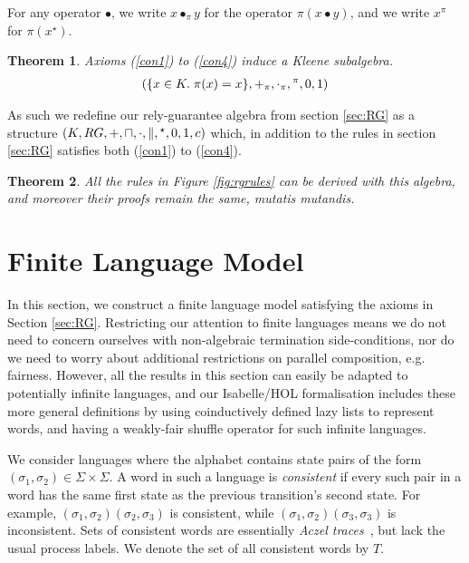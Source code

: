 \documentclass{llncs}
\newtheorem{thm}{Theorem}
\begin{document}
For any operator $\bullet$, we write $x \bullet_\pi y$ for the
operator $\pi(x\bullet y)$, and we write $x^\pi$ for
$\pi(x^\star)$.
\begin{thm}
Axioms (\ref{con1}) to (\ref{con4}) induce a Kleene subalgebra.
\begin{align*}
(\{x\in K.\; \pi(x) = x\}, +_\pi, \cdot_\pi, \hphantom{}^\pi,0,1)
\end{align*}
\end{thm}
As such we redefine our rely-guarantee algebra from section
\ref{sec:RG} as a structure $(K,RG,+,\sqcap,\cdot,\|,\hphantom{}^\star,0,1,c)$
which, in addition to the rules in section \ref{sec:RG} satisfies both
(\ref{con1}) to (\ref{con4}).
\begin{thm}
All the rules in Figure \ref{fig:rgrules} can be derived with this
algebra, and moreover their proofs remain the same, mutatis
mutandis.
\end{thm}

\section{Finite Language Model}
\label{sec:Model}

In this section, we construct a finite language model satisfying the
axioms in Section \ref{sec:RG}. Restricting our attention to finite
languages means we do not need to concern ourselves with non-algebraic
termination side-conditions, nor do we need to worry about additional
restrictions on parallel composition, e.g. fairness. However, all the
results in this section can easily be adapted to potentially
infinite languages, and our Isabelle/HOL formalisation includes these more
general definitions by using coinductively defined lazy lists to
represent words, and having a weakly-fair shuffle operator for such
infinite languages.

We consider languages where the alphabet contains state pairs of the
form $(\sigma_1,\sigma_2) \in \Sigma \times \Sigma$. A word in such a
language is \emph{consistent} if every such pair in a word has the
same first state as the previous transition's second state. For
example, $(\sigma_1,\sigma_2)(\sigma_2,\sigma_3)$ is consistent, while
$(\sigma_1,\sigma_2)(\sigma_3,\sigma_3)$ is inconsistent. Sets of
consistent words are essentially \emph{Aczel
  traces}~\cite{boer_formal_1999}, but lack the usual process
labels. We denote the set of all consistent words by $T$.
\end{document}
